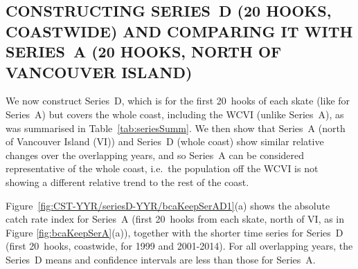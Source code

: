 


\subsection{CONSTRUCTING SERIES~D (20 HOOKS, COASTWIDE) AND COMPARING IT WITH SERIES~A (20 HOOKS, NORTH OF VANCOUVER ISLAND)}\label{sec:compareAD}


We now construct Series~D, which is for the first 20~hooks of each skate (like for Series~A) but covers the whole coast, including the WCVI (unlike Series~A), as was summarised in Table~\ref{tab:seriesSumm}. We then show that Series~A (north of Vancouver Island (VI)) and Series~D (whole coast) show similar relative changes over the overlapping years, and so Series~A can be considered representative of the whole coast, i.e.~the population off the WCVI is not showing a different relative trend to the rest of the coast. %

Figure~\ref{fig:CST-YYR/seriesD-YYR/bcaKeepSerAD1}(a) shows the absolute catch
rate index for Series~A (first 20~hooks from each skate, north of VI, as in
Figure \ref{fig:bcaKeepSerA}(a)), together with the shorter time series for
Series~D (first 20~hooks, coastwide, for 1999 and 2001-2014). For all
overlapping years, the Series~D means and confidence intervals are less than
those for Series~A.

